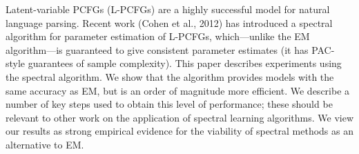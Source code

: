 Latent-variable PCFGs (L-PCFGs) are a highly successful model for natural language parsing.  Recent work (Cohen et al., 2012) has introduced a spectral
 algorithm for parameter estimation of L-PCFGs, which---unlike the EM
 algorithm---is guaranteed to give consistent parameter estimates (it has
 PAC-style guarantees of sample complexity).  This paper describes experiments
 using the spectral algorithm. We show that the algorithm provides models with
 the same accuracy as EM, but is an order of magnitude more efficient. We
 describe a number of key steps used to obtain this level of performance; these
 should be relevant to other work on the application of spectral learning
 algorithms. We view our results as strong empirical evidence for the viability
 of spectral methods as an alternative to EM.

